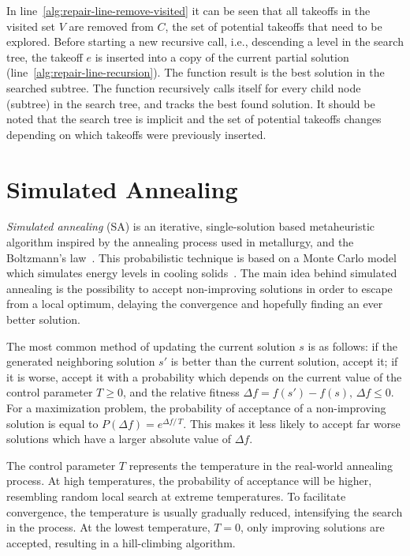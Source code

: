 In line~\ref{alg:repair-line-remove-visited} it can be seen that all takeoffs in the visited set $V$ are removed from $C$, the set of potential takeoffs that need to be explored.
Before starting a new recursive call, i.e., descending a level in the search tree, the takeoff $e$ is inserted into a copy of the current partial solution (line~\ref{alg:repair-line-recursion}).
The function result is the best solution in the searched subtree.
The function recursively calls itself for every child node (subtree) in the search tree, and tracks the best found solution.
It should be noted that the search tree is implicit and the set of potential takeoffs changes depending on which takeoffs were previously inserted.


\section{Simulated Annealing}\label{sec:simulated-annealing}

\textit{Simulated annealing} (SA) is an iterative, single-solution based metaheuristic algorithm inspired by the annealing process used in metallurgy, and the Boltzmann's law~\cite{Kirkpatrick/SA}.
This probabilistic technique is based on a Monte Carlo model which simulates energy levels in cooling solids~\cite{Misevicius/SA}.
The main idea behind simulated annealing is the possibility to accept non-improving solutions in order to escape from a local optimum, delaying the convergence and hopefully finding an ever better solution.

The most common method of updating the current solution $s$ is as follows:
if the generated neighboring solution $s'$ is better than the current solution, accept it;
if it is worse, accept it with a probability which depends on the current value of the control parameter $T \ge 0$, and the relative fitness $\Delta f = f(s') - f(s), \, \Delta f \le 0$.
For a maximization problem, the probability of acceptance of a non-improving solution is equal to $P(\Delta f) = e^{\Delta f / \, T}$.
This makes it less likely to accept far worse solutions which have a larger absolute value of $\Delta f$.

The control parameter $T$ represents the temperature in the real-world annealing process.
At high temperatures, the probability of acceptance will be higher, resembling random local search at extreme temperatures.
To facilitate convergence, the temperature is usually gradually reduced, intensifying the search in the process.
At the lowest temperature, $T = 0$, only improving solutions are accepted, resulting in a hill-climbing algorithm.

